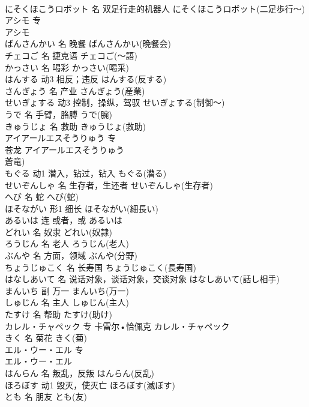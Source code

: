 \documentclass[8pt]{extreport}
\begin{document}
\begin{CJK}{UTF8}{min}
\\	にそくほこうロボット	名	双足行走的机器人	にそくほこうロボット(二足歩行～)	
\\	アシモ	专	
\\	アシモ
\\	ばんさんかい	名	晚餐	ばんさんかい(晩餐会)	
\\	チェコご	名	捷克语	チェコご(～語)	
\\	かっさい	名	喝彩	かっさい(喝采)	
\\	はんする	动3	相反；违反	はんする(反する)	
\\	さんぎょう	名	产业	さんぎょう(産業)	
\\	せいぎょする	动3	控制，操纵，驾驭	せいぎょする(制御～)	
\\	うで	名	手臂，胳膊	うで(腕)	
\\	きゅうじょ	名	救助	きゅうじょ(救助)	
\\	アイアールエスそうりゅう	专	
\\	苍龙	アイアールエスそうりゅう
\\	蒼竜)	
\\	もぐる	动1	潜入，钻过，钻入	もぐる(潜る)	
\\	せいぞんしゃ	名	生存者，生还者	せいぞんしゃ(生存者)	
\\	へび	名	蛇	へび(蛇)	
\\	ほそながい	形1	细长	ほそながい(細長い)	
\\	あるいは	连	或者，或	あるいは	
\\	どれい	名	奴隶	どれい(奴隷)	
\\	ろうじん	名	老人	ろうじん(老人)	
\\	ぶんや	名	方面，领域	ぶんや(分野)	
\\	ちょうじゅこく	名	长寿国	ちょうじゅこく(長寿国)	
\\	はなしあいて	名	说话对象，谈话对象，交谈对象	はなしあいて(話し相手)	
\\	まんいち	副	万一	まんいち(万一)	
\\	しゅじん	名	主人	しゅじん(主人)	
\\	たすけ	名	帮助	たすけ(助け)	
\\	カレル・チャペック	专	卡雷尔•恰佩克	カレル・チャペック	
\\	きく	名	菊花	きく(菊)	
\\	エル・ウー・エル	专	
\\	エル・ウー・エル
\\	はんらん	名	叛乱，反叛	はんらん(反乱)	
\\	ほろぼす	动1	毁灭，使灭亡	ほろぼす(滅ぼす)	
\\	とも	名	朋友	とも(友)	

\end{CJK}
\end{document}
